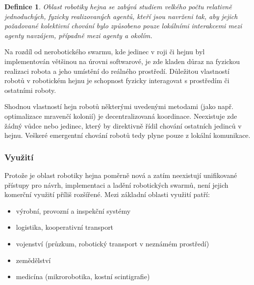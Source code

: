 \documentclass[a4paper,12pt]{article}
\newtheorem{define}{Definice}
\begin{document}
\begin{define} Oblast robotiky hejna se zabývá studiem
velkého počtu relativně jednoduchých, fyzicky realizovaných agentů, kteří jsou
navrženi tak, aby jejich požadované kolektivní chování bylo způsobeno pouze
lokálními interakcemi mezi agenty navzájem, případně mezi agenty a okolím.
\cite{Sahin05}
\end{define}

Na rozdíl od nerobotického swarmu, kde jedinec v roji či hejnu byl implementován
většinou na úrovni softwarové, je zde kladen důraz na fyzickou realizaci robota
a jeho umístění do reálného prostředí. Důležitou vlastností robotů v robotickém
hejnu je schopnost fyzicky interagovat s prostředím či ostatními roboty.

Shodnou vlastností hejn robotů některými uvedenými metodami (jako např. optimalizace
mravenčí kolonií) je decentralizovaná koordinace. Neexistuje zde žádný vůdce
nebo jedinec, který by direktivně řídil chování ostatních jedinců v hejnu.
Veškeré emergentní chování robotů tedy plyne pouze z lokální komunikace.

\subsubsection{Využití}
Protože je oblast robotiky hejna poměrně nová a zatím neexistují unifikované přístupy
pro návrh, implementaci a ladění robotických swarmů, není jejich komerční využití
příliš rozšířené. Mezi základní oblasti využití patří:
\begin{itemize}
  \item výrobní, provozní a inspekční systémy
  \item logistika, kooperativní transport
  \item vojenství (průzkum, robotický transport v neznámém prostředí)
  \item zemědělství
  \item medicína (mikrorobotika, kostní scintigrafie\cite{Rifaie11})
\end{itemize}
\end{document}
